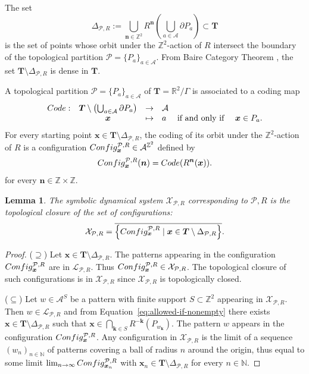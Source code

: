\documentclass[12pt]{amsart}
\newtheorem{lemma}[definition]{Lemma}
\newcommand{\N}{\mathbb{N}}
\newcommand{\Z}{\mathbb{Z}}
\newcommand{\R}{\mathbb{R}}
\newcommand{\bk}{{\boldsymbol{k}}}
\newcommand{\bn}{{\boldsymbol{n}}}
\newcommand{\bx}{{\boldsymbol{x}}}
\newcommand{\Acal}{\mathcal{A}} %
\newcommand{\Lcal}{\mathcal{L}}
\newcommand{\Pcal}{\mathcal{P}}
\newcommand{\Xcal}{\mathcal{X}} %
\newcommand{\generictorus}{{\boldsymbol{T}}}
\newcommand{\scConfig}{\textsc{Config}}
\newcommand{\sccode}{\textsc{Code}}
\begin{document}
The set
\begin{equation*}\label{eq:boundaries}
    \Delta_{\Pcal,R}:=\bigcup_{\bn\in\Z^2}R^\bn
         \left(\bigcup_{a\in\Acal}\partial P_a\right)
         \subset \generictorus
\end{equation*}
is the set of points whose orbit under the $\Z^2$-action of $R$ intersect
the boundary of the topological partition
$\Pcal=\{P_a\}_{a\in\Acal}$.
From Baire Category Theorem \cite[Theorem 6.1.24]{MR1369092}, the set
$\generictorus\setminus\Delta_{\Pcal,R}$ is dense in $\generictorus$.

A topological partition $\Pcal=\{P_a\}_{a\in \Acal}$ of $\generictorus=\R^2/\Gamma$
is associated to a coding map
\[
\begin{array}{rccl}
    \sccode:& \generictorus\setminus\left(\bigcup_{a\in \Acal}\partial
    P_a\right) &\to & \Acal \\
    &\bx &\mapsto & a \quad\text{ if and only if }
    \quad \bx\in P_a.
\end{array}
\]
For every starting point 
$\bx\in \generictorus\setminus \Delta_{\Pcal,R}$, 
the coding of its orbit under the
$\Z^2$-action of $R$ is a configuration
$\scConfig^{\Pcal,R}_{\bx}\in\Acal^{\Z^2}$ defined by
\[
    \scConfig^{\Pcal,R}_{\bx}(\bn)=\sccode(R^\bn(\bx)).
\]
for every $\bn\in\Z\times\Z$.

\begin{lemma}\label{lem:closure-of-tilings}
The symbolic dynamical system $\Xcal_{\Pcal,R}$
    corresponding to $\Pcal,R$ is the topological closure of the set of configurations:
\[
    \Xcal_{\Pcal,R}
    = \overline{\left\{\scConfig^{\Pcal,R}_\bx\mid
                       \bx\in\generictorus\setminus \Delta_{\Pcal,R}\right\}}.
\]
\end{lemma}

\begin{proof}
    ($\supseteq$) 
    Let $\bx\in\generictorus\setminus \Delta_{\Pcal,R}$.
    The patterns appearing in the configuration
    $\scConfig^{\Pcal,R}_\bx$ are in $\Lcal_{\Pcal,R}$.
    Thus $\scConfig^{\Pcal,R}_\bx\in\Xcal_{\Pcal,R}$.
    The topological closure of such configurations is in $\Xcal_{\Pcal,R}$ 
    since $\Xcal_{\Pcal,R}$ is topologically closed.

    ($\subseteq$)
    Let $w\in\Acal^S$ be a pattern with finite support $S\subset\Z^2$ appearing
    in $\Xcal_{\Pcal,R}$.
    Then $w\in\Lcal_{\Pcal,R}$ and from Equation~\eqref{eq:allowed-if-nonempty}
    there exists $\bx\in\generictorus\setminus\Delta_{\Pcal,R}$
    such that
        $\bx\in\bigcap_{\bk\in S} R^{-\bk}(P_{w_\bk})$.
        The pattern $w$ appears in the configuration
    $\scConfig^{\Pcal,R}_\bx$.
    Any configuration
    in $\Xcal_{\Pcal,R}$ is 
    the limit of a sequence $(w_n)_{n\in\N}$ of patterns covering
    a ball of radius $n$ around the origin,
    thus equal to
    some limit $\lim_{n\to\infty}\scConfig^{\Pcal,R}_{\bx_n}$
    with $\bx_n\in\generictorus\setminus\Delta_{\Pcal,R}$ for every $n\in\N$.
\end{proof}
\end{document}
